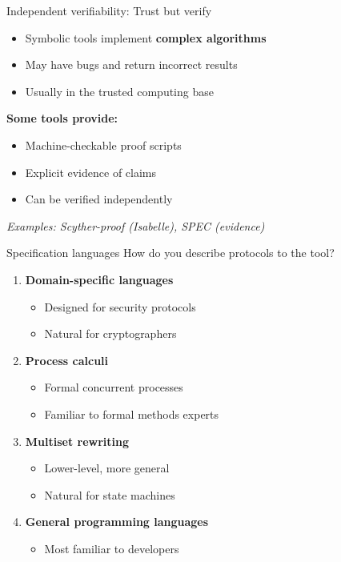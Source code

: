 \documentclass[aspectratio=169, lualatex, handout]{beamer}
\begin{document}
\begin{frame}{Independent verifiability: Trust but verify}
	\begin{itemize}
		\item Symbolic tools implement \textbf{complex algorithms}
		\item May have bugs and return incorrect results
		\item Usually in the trusted computing base
	\end{itemize}
	\vspace{0.5em}
	\textbf{Some tools provide:}
	\begin{itemize}
		\item Machine-checkable proof scripts
		\item Explicit evidence of claims
		\item Can be verified independently
	\end{itemize}
	\vspace{0.5em}
	\begin{center}
		\textit{Examples: Scyther-proof (Isabelle), SPEC (evidence)}
	\end{center}
\end{frame}

\begin{frame}{Specification languages}
	How do you describe protocols to the tool?
	\vspace{0.5em}
	\begin{enumerate}
		\item \textbf{Domain-specific languages}
		      \begin{itemize}
			      \item Designed for security protocols
			      \item Natural for cryptographers
		      \end{itemize}
		\item \textbf{Process calculi}
		      \begin{itemize}
			      \item Formal concurrent processes
			      \item Familiar to formal methods experts
		      \end{itemize}
		\item \textbf{Multiset rewriting}
		      \begin{itemize}
			      \item Lower-level, more general
			      \item Natural for state machines
		      \end{itemize}
		\item \textbf{General programming languages}
		      \begin{itemize}
			      \item Most familiar to developers
		      \end{itemize}
	\end{enumerate}
\end{frame}
\end{document}
